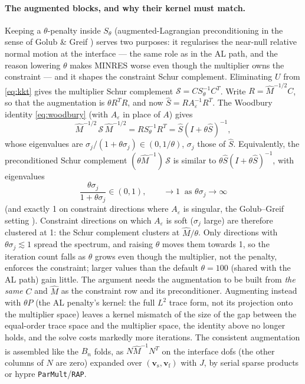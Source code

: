 \documentclass[11pt]{article}
\newcommand{\eps}{\varepsilon}
\newcommand{\bv}{\mathbf{v}}
\begin{document}
\paragraph{The augmented blocks, and why their kernel must match.}
Keeping a $\theta$-penalty inside $S_\theta$ (augmented-Lagrangian
preconditioning in the sense of Golub \& Greif \cite{GolubGreif2003})
serves two purposes: it regularises the near-null relative normal motion
at the interface --- the same role as in the AL path, and the reason
lowering $\theta$ makes MINRES worse even though the multiplier owns the
constraint --- and it shapes the constraint Schur complement.
Eliminating $U$ from \eqref{eq:kkt} gives the multiplier Schur
complement $\mathcal{S} = C S_\theta^{-1} C^{T}$. Write
$R = \hat M^{-1/2}C$, so that the augmentation is $\theta R^{T}R$, and
now $\hat S = RA_\eps^{-1}R^{T}$. The Woodbury identity
\eqref{eq:woodbury} (with $A_\eps$ in place of $A$) gives
\begin{equation}
  \hat M^{-1/2}\,\mathcal{S}\,\hat M^{-1/2} = R S_\theta^{-1}R^{T}
  = \hat S(I + \theta\hat S)^{-1},
\end{equation}
whose eigenvalues are $\sigma_j/(1 + \theta\sigma_j)\in(0, 1/\theta)$,
$\sigma_j$ those of $\hat S$. Equivalently, the preconditioned Schur
complement $(\theta\hat M^{-1})\,\mathcal{S}$ is similar to
$\theta\hat S(I + \theta\hat S)^{-1}$, with eigenvalues
\begin{equation}
  \frac{\theta\sigma_j}{1 + \theta\sigma_j}\in(0,1),
  \qquad \to 1 \ \text{ as } \theta\sigma_j\to\infty
\end{equation}
(and exactly 1 on constraint directions where $A_\eps$ is singular, the
Golub--Greif setting \cite{GolubGreif2003}). Constraint directions on
which $A_\eps$ is soft ($\sigma_j$ large) are therefore clustered at 1:
the Schur complement clusters at $\hat M/\theta$. Only directions with
$\theta\sigma_j\lesssim1$ spread the spectrum, and raising $\theta$
moves them towards 1, so the iteration count falls as $\theta$ grows
even though the multiplier, not the penalty, enforces the constraint;
larger values than the default $\theta = 100$ (shared with the AL path)
gain little. The argument needs the augmentation to be built from
\emph{the same} $C$ and $\hat M$ as the constraint row and its
preconditioner. Augmenting instead with $\theta P$ (the AL penalty's
kernel: the full $L^2$ trace form, not its projection onto the
multiplier space) leaves a kernel mismatch of the size of the gap
between the equal-order trace space and the multiplier space, the
identity above no longer holds, and the solve costs markedly more
iterations. The consistent augmentation is assembled like the $B_n$
folds, as $N\hat M^{-1}N^{T}$ on the interface dofs (the other columns
of $N$ are zero) expanded over $(\bv_{\mathrm{s}}, \bv_{\mathrm{f}})$
with $J$, by serial sparse products or hypre
\texttt{ParMult}/\texttt{RAP}.
\end{document}
